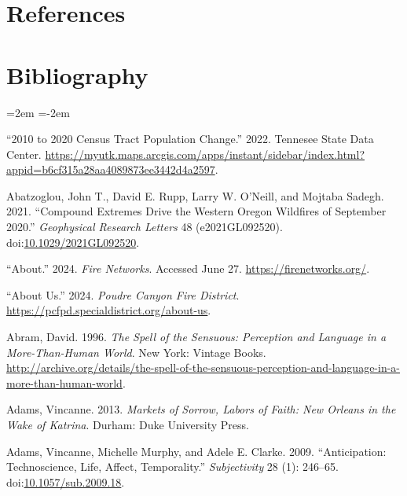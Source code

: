 \documentclass[
]{article}
\newlength{\cslhangindent}
\newenvironment{CSLReferences}[2] %
 {\begin{list}{}{%
  \setlength{\itemindent}{0pt}
  \setlength{\leftmargin}{0pt}
  \setlength{\parsep}{0pt}
  \ifodd #1
   \setlength{\leftmargin}{\cslhangindent}
   \setlength{\itemindent}{-1\cslhangindent}
  \fi
  \setlength{\itemsep}{#2\baselineskip}}}
 {\end{list}}
\begin{document}
\section{References}\label{references-4}

\clearpage

\section*{Bibliography}

\noindent
\leftskip=2em
\parindent=-2em

\label{refs}
\begin{CSLReferences}{1}{0}
{``2010 to 2020 {Census Tract Population Change}.''} 2022. Tennesee State Data Center. \url{https://myutk.maps.arcgis.com/apps/instant/sidebar/index.html?appid=b6cf315a28aa4089873ee3442d4a2597}.

Abatzoglou, John T., David E. Rupp, Larry W. O'Neill, and Mojtaba Sadegh. 2021. {``Compound {Extremes Drive} the {Western Oregon Wildfires} of {September} 2020.''} \emph{Geophysical Research Letters} 48 (e2021GL092520). doi:\href{https://doi.org/10.1029/2021GL092520}{10.1029/2021GL092520}.

{``About.''} 2024. \emph{Fire Networks}. Accessed June 27. \url{https://firenetworks.org/}.

{``About {Us}.''} 2024. \emph{Poudre Canyon Fire District}. \url{https://pcfpd.specialdistrict.org/about-us}.

Abram, David. 1996. \emph{The {Spell} of the {Sensuous}: {Perception} and {Language} in a {More-Than-Human World}}. New York: Vintage Books. \url{http://archive.org/details/the-spell-of-the-sensuous-perception-and-language-in-a-more-than-human-world}.

Adams, Vincanne. 2013. \emph{Markets of {Sorrow}, {Labors} of {Faith}: {New Orleans} in the {Wake} of {Katrina}}. Durham: Duke University Press.

Adams, Vincanne, Michelle Murphy, and Adele E. Clarke. 2009. {``Anticipation: {Technoscience}, Life, Affect, Temporality.''} \emph{Subjectivity} 28 (1): 246--65. doi:\href{https://doi.org/10.1057/sub.2009.18}{10.1057/sub.2009.18}.


\end{CSLReferences}
\end{document}
